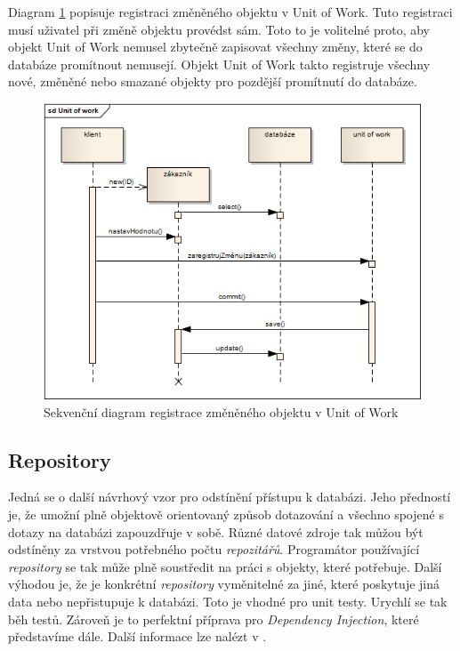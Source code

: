\documentclass[11pt,twoside,a4paper]{book}
\begin{document}
Diagram \ref{fig:uow} popisuje registraci změněného objektu v Unit of Work. Tuto registraci musí uživatel při změně objektu provédst sám. Toto to je volitelné proto, aby objekt Unit of Work nemusel zbytečně zapisovat všechny změny, které se do databáze promítnout nemusejí. Objekt Unit of Work takto registruje všechny nové, změněné nebo smazané objekty pro pozdější promítnutí do databáze.
\begin{figure}[h!]
\begin{center}
\includegraphics[scale=0.7]{figures/uow}
\caption{Sekvenční diagram registrace změněného objektu v Unit of Work}
\label{fig:uow}
\end{center}
\end{figure}


\subsection{Repository}

Jedná se o další návrhový vzor pro odstínění přístupu k databázi. Jeho předností je, že umožní plně objektově orientovaný způsob dotazování a všechno spojené s dotazy na databázi zapouzdřuje v sobě. Různé datové zdroje tak můžou být odstíněny za vrstvou potřebného počtu \textit{repozitářů}. Programátor používající \textit{repository} se tak může plně soustředit na práci s objekty, které potřebuje. Další výhodou je, že je konkrétní \textit{repository} vyměnitelné za jiné, které poskytuje jiná data nebo nepřistupuje k databázi. Toto je vhodné pro unit testy. Urychlí se tak běh testů. Zároveň je to perfektní příprava pro \textit{Dependency Injection}, které představíme dále. Další informace lze nalézt v \citep{PEAA}.
\end{document}
